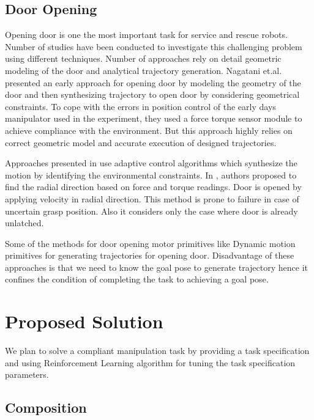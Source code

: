 \documentclass[thesis]{mas_proposal}
\begin{document}
\section{Door Opening}

Opening door is one the most important task for service and rescue robots. Number of studies have been conducted to investigate this challenging problem using different techniques. Number of approaches rely on detail geometric modeling of the door and analytical trajectory generation. Nagatani et.al. \cite{nagatani1995experiment} presented an early approach for opening door by modeling the geometry of the door and then synthesizing trajectory to open door by considering geometrical constraints. To cope with the errors in position control of the early days manipulator used in the experiment, they used a force torque sensor module to achieve compliance with the environment. But this approach highly relies on correct geometric model and accurate execution of designed trajectories.

Approaches presented in \cite{levihn2014using,karayiannidis2012adaptive,niemeyer1997simple} use adaptive control algorithms which synthesize the motion by identifying the environmental constraints. In \cite{karayiannidis2012adaptive}, authors proposed to find the radial direction based on force and torque readings. Door is opened by applying velocity in radial direction. This method is prone to failure in case of uncertain grasp position. Also it considers only the case where door is already unlatched. 

Some of the methods for door opening motor primitives like Dynamic motion primitives for generating trajectories for opening door. Disadvantage of these approaches is that we need to know the goal pose to generate trajectory hence it confines the condition of completing the task to achieving a goal pose. 


\chapter{Proposed Solution}

We plan to solve a compliant manipulation task by providing a task specification and using Reinforcement Learning algorithm for tuning the task specification parameters.

\section{Composition}
\end{document}
